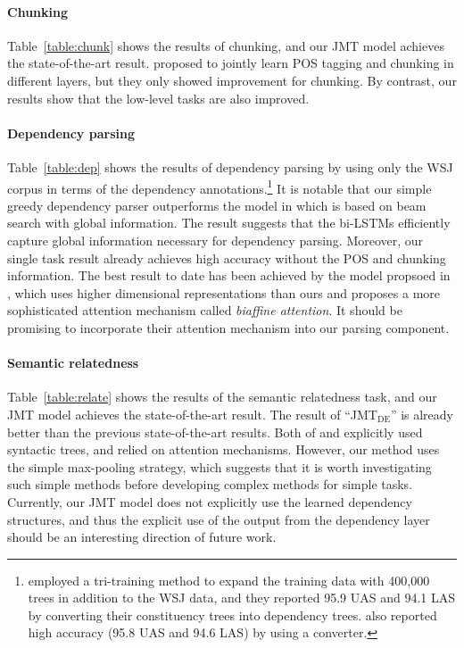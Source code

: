 \documentclass[11pt,a4paper]{article}
\begin{document}
\paragraph{Chunking}
Table~\ref{table:chunk} shows the results of chunking, and our JMT model achieves the state-of-the-art result.
\citet{sogaard2016} proposed to jointly learn POS tagging and chunking in different layers, but they only showed improvement for chunking.
By contrast, our results show that the low-level tasks are also improved.


\paragraph{Dependency parsing}
Table~\ref{table:dep} shows the results of dependency parsing by using only the WSJ corpus in terms of the dependency annotations.\footnote{\citet{choe2016dep} employed a tri-training method to expand the training data with 400,000 trees in addition to the WSJ data, and they reported 95.9 UAS and 94.1 LAS by converting their constituency trees into dependency trees.
\citet{kuncoro2017} also reported high accuracy (95.8 UAS and 94.6 LAS) by using a converter.
}
It is notable that our simple greedy dependency parser outperforms the model in \citet{andor2016} which is based on beam search with global information.
The result suggests that the bi-LSTMs efficiently capture global information necessary for dependency parsing.
Moreover, our single task result already achieves high accuracy without the POS and chunking information.
The best result to date has been achieved by the model propsoed in \citet{biaffine2017}, which uses higher dimensional representations than ours and proposes a more sophisticated attention mechanism called {\it biaffine attention}.
It should be promising to incorporate their attention mechanism into our parsing component.

\paragraph{Semantic relatedness}
Table~\ref{table:relate} shows the results of the semantic relatedness task, and our JMT model achieves the state-of-the-art result.
The result of ``JMT$_{\mathrm{DE}}$'' is already better than the previous state-of-the-art results.
Both of \citet{zhou2016coling} and \citet{tai2015treelstm} explicitly used syntactic trees, and \citet{zhou2016coling} relied on attention mechanisms.
However, our method uses the simple max-pooling strategy, which suggests that it is worth investigating such simple methods before developing complex methods for simple tasks.
Currently, our JMT model does not explicitly use the learned dependency structures, and thus the explicit use of the output from the dependency layer should be an interesting direction of future work.
\end{document}
